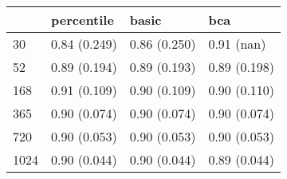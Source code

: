 \begin{tabular}{llll}
\toprule
 & percentile & basic & bca \\
\midrule
30 & 0.84 (0.249) & 0.86 (0.250) & 0.91 (nan) \\
52 & 0.89 (0.194) & 0.89 (0.193) & 0.89 (0.198) \\
168 & 0.91 (0.109) & 0.90 (0.109) & 0.90 (0.110) \\
365 & 0.90 (0.074) & 0.90 (0.074) & 0.90 (0.074) \\
720 & 0.90 (0.053) & 0.90 (0.053) & 0.90 (0.053) \\
1024 & 0.90 (0.044) & 0.90 (0.044) & 0.89 (0.044) \\
\bottomrule
\end{tabular}
